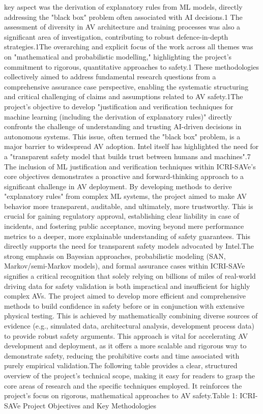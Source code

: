 key aspect was the derivation of explanatory rules from ML models, directly addressing the "black box" problem often associated with AI decisions.1 The assessment of diversity in AV architecture and training processes was also a significant area of investigation, contributing to robust defence-in-depth strategies.1The overarching and explicit focus of the work across all themes was on "mathematical and probabilistic modelling," highlighting the project's commitment to rigorous, quantitative approaches to safety.1 These methodologies collectively aimed to address fundamental research questions from a comprehensive assurance case perspective, enabling the systematic structuring and critical challenging of claims and assumptions related to AV safety.1The project's objective to develop "justification and verification techniques for machine learning (including the derivation of explanatory rules)" directly confronts the challenge of understanding and trusting AI-driven decisions in autonomous systems. This issue, often termed the "black box" problem, is a major barrier to widespread AV adoption. Intel itself has highlighted the need for a "transparent safety model that builds trust between humans and machines".7 The inclusion of ML justification and verification techniques within ICRI-SAVe's core objectives demonstrates a proactive and forward-thinking approach to a significant challenge in AV deployment. By developing methods to derive "explanatory rules" from complex ML systems, the project aimed to make AV behavior more transparent, auditable, and ultimately, more trustworthy. This is crucial for gaining regulatory approval, establishing clear liability in case of incidents, and fostering public acceptance, moving beyond mere performance metrics to a deeper, more explainable understanding of safety guarantees. This directly supports the need for transparent safety models advocated by Intel.The strong emphasis on Bayesian approaches, probabilistic modeling (SAN, Markov/semi-Markov models), and formal assurance cases within ICRI-SAVe signifies a critical recognition that solely relying on billions of miles of real-world driving data for safety validation is both impractical and insufficient for highly complex AVs. The project aimed to develop more efficient and comprehensive methods to build confidence in safety before or in conjunction with extensive physical testing. This is achieved by mathematically combining diverse sources of evidence (e.g., simulated data, architectural analysis, development process data) to provide robust safety arguments. This approach is vital for accelerating AV development and deployment, as it offers a more scalable and rigorous way to demonstrate safety, reducing the prohibitive costs and time associated with purely empirical validation.The following table provides a clear, structured overview of the project's technical scope, making it easy for readers to grasp the core areas of research and the specific techniques employed. It reinforces the project's focus on rigorous, mathematical approaches to AV safety.Table 1: ICRI-SAVe Project Objectives and Key Methodologies
